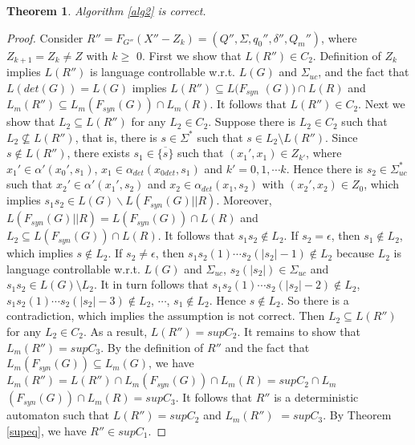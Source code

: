 \documentclass[preprint,authoryear,12pt]{elsarticle}
\newtheorem{Theorem}{Theorem}
\begin{document}
\begin{Theorem}\label{calz}
Algorithm \ref{alg2} is correct.
\end{Theorem}
\begin{proof}
Consider $R''\!=F_{G''}(X''\!-Z_{k})\!=(Q'', \Sigma, q_0'',
\delta'', Q_{m}'')$, where $Z_{k+1}\!=Z_{k}\!\neq Z$ with $k
\!\geq $ $0$. First we show that $L(R'') \!\in C_2$. Definition of
$Z_{k}$ implies $L(R'')$ is language controllable w.r.t. $L(G)$
and $\Sigma_{uc}$, and the fact that $L(det(G))\!=L(G)$ implies
$L(R'') \!\subseteq L(F_{syn}$ $ (G)) \!\cap L(R)$ and $L_{m}(R'')
\!\subseteq \!L_{m}(F_{syn}(G)) \!\cap L_{m}(R)$. It follows that
$L(R'') \!\in C_2$. Next we show that $L_2 \!\subseteq L(R'')$ for
any $L_2 \! \in C_2$. Suppose there is $L_2 \! \in C_2$ such that
$L_2 \!\nsubseteq L(R'')$, that is, there is $s \!\in \Sigma^{*}$
such that $s \!\in L_2 \!\setminus L(R'')$. Since $s \! \notin
L(R'')$, there exists $s_1 \!\in \overline{\{s\}}$ such that
$(x_1', x_1) \!\in Z_{k'}$, where $x_1' \!\in \alpha'(x_0', s_1)$,
$x_1 \!\in \alpha_{det}(x_{0det}, s_1)$ and $k'\!=0, 1, \cdots k$.
Hence there is $s_2 \in \Sigma_{uc}^{*}$ such that $x_2' \!\in
\alpha'(x_1', s_2)$ and $x_2 \!\in \alpha_{det}(x_1, s_2)$ with
$(x_2', x_2) \!\in Z_{0}$, which implies $s_1s_2 \!\in L(G)
\!\backslash L(F_{syn}(G)||R)$. Moreover,
$L(F_{syn}(G)||R)\!=L(F_{syn}(G)) \!\cap L(R)$ and $L_2
\!\subseteq L(F_{syn}(G)) \!\cap L(R)$. It follows that $s_1s_2
\!\notin L_2$. If $s_2 \!= \epsilon$, then $s_1 \!\notin L_2$,
which implies $s \!\notin L_2$. If $s_2 \!\neq \epsilon$, then
$s_1s_2(1)\cdots s_2(|s_2|-1) \!\notin L_2$ because $L_2$ is
language controllable w.r.t. $L(G)$ and $\Sigma_{uc}$, $s_2(|s_2|)
\!\in \Sigma_{uc}$ and $s_1s_2 \!\in L(G)\!\setminus L_2$. It in
turn follows that $s_1s_2(1)\!\cdots s_2(|s_2|-2) \!\notin L_2$,
$s_1s_2(1)\!\cdots s_2(|s_2|-3) \!\notin L_2$, $\cdots$, $s_1
\!\notin L_2$. Hence $s \!\notin L_2$. So there is a
contradiction, which implies the assumption is not correct. Then
$L_2 \!\subseteq L(R'')$ for any $L_2 \!\in C_2$. As a result,
$L(R'')\!=supC_2$. It remains to show that $L_{m}(R'')\!=supC_3$.
By the definition of $R''$ and the fact that $L_{m}(F_{syn}(G))
\!\subseteq L_{m}(G)$, we have $L_{m}(R'')\!=L(R'')\!\cap
L_{m}(F_{syn}(G))\! \cap L_{m}(R)\!=supC_2 \!\cap L_{m}$
$(F_{syn}(G)) \!\cap L_{m}(R)\!=supC_3$. It follows that $R''$ is
a deterministic automaton such that $L(R'')\!=supC_2$ and
$L_{m}(R'')$ $=\!supC_3$. By Theorem \ref{supeq}, we have $R''
\!\in supC_1$.

\end{proof}
\end{document}
